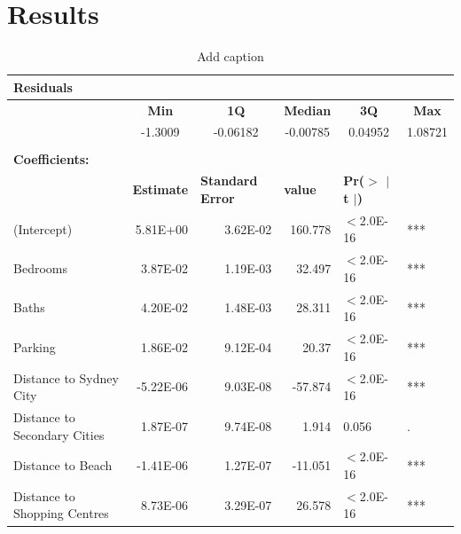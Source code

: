 \section{Results}
\renewcommand{\baselinestretch}{0.8}
\begin{table}[!ht]
  \centering \small
  \caption{Add caption}
    \begin{tabular}{llllll}
    \multicolumn{6}{l}{\textbf{Residuals}} \\
    \midrule
    & \multicolumn{1}{c}{\textbf{Min}} & \multicolumn{1}{c}{\textbf{1Q}} & \multicolumn{1}{c}{\textbf{Median}} & \multicolumn{1}{c}{\textbf{3Q}} & \multicolumn{1}{c}{\textbf{Max}}   \\
    &\multicolumn{1}{c}{-1.3009} & \multicolumn{1}{c}{-0.06182} & \multicolumn{1}{c}{-0.00785} & \multicolumn{1}{c}{0.04952} & \multicolumn{1}{c}{1.08721}   \\
          &       &       &       &       &  \\
    \textbf{Coefficients:} &       &       &       &       &  \\
    \midrule
          & \textbf{Estimate} & \textbf{Standard Error} & \textbf{value} & \textbf{Pr($>$ $|$ t $|$)} &  \\
    (Intercept) & \multicolumn{1}{r}{5.81E+00} & \multicolumn{1}{r}{3.62E-02} & \multicolumn{1}{r}{160.778} & $<$2.0E-16 & *** \\
    Bedrooms & \multicolumn{1}{r}{3.87E-02} & \multicolumn{1}{r}{1.19E-03} & \multicolumn{1}{r}{32.497} & $<$2.0E-16 & *** \\
    Baths & \multicolumn{1}{r}{4.20E-02} & \multicolumn{1}{r}{1.48E-03} & \multicolumn{1}{r}{28.311} & $<$2.0E-16 & *** \\
    Parking & \multicolumn{1}{r}{1.86E-02} & \multicolumn{1}{r}{9.12E-04} & \multicolumn{1}{r}{20.37} & $<$2.0E-16 & *** \\
    Distance to Sydney City & \multicolumn{1}{r}{-5.22E-06} & \multicolumn{1}{r}{9.03E-08} & \multicolumn{1}{r}{-57.874} & $<$2.0E-16 & *** \\
    Distance to Secondary Cities & \multicolumn{1}{r}{1.87E-07} & \multicolumn{1}{r}{9.74E-08} & \multicolumn{1}{r}{1.914} & 0.056 & . \\
    Distance to Beach & \multicolumn{1}{r}{-1.41E-06} & \multicolumn{1}{r}{1.27E-07} & \multicolumn{1}{r}{-11.051} & $<$2.0E-16 & *** \\
    Distance to Shopping Centres & \multicolumn{1}{r}{8.73E-06} & \multicolumn{1}{r}{3.29E-07} & \multicolumn{1}{r}{26.578} & $<$2.0E-16 & *** \\

\end{tabular}
\end{table}
